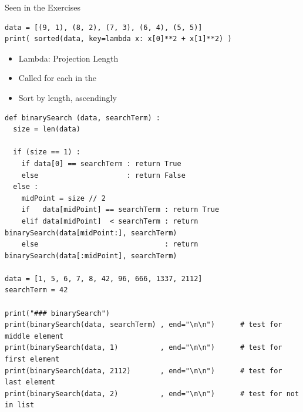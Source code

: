 \begin{frame}[fragile]{Seen in the Exercises}
%
\begin{codebox}
\begin{verbatim}
data = [(9, 1), (8, 2), (7, 3), (6, 4), (5, 5)]
print( sorted(data, key=lambda x: x[0]**2 + x[1]**2) )
\end{verbatim}
\end{codebox}
%
\begin{itemize}
\item Lambda: Projection  \thus Length
\item Called for each  in the 
\item Sort by length, ascendingly 
\end{itemize}
%
\end{frame}


\begin{frame}[fragile]
%
\begin{codebox}
\begin{verbatim}
def binarySearch (data, searchTerm) :
  size = len(data)
  
  if (size == 1) :
    if data[0] == searchTerm : return True
    else                     : return False
  else :
    midPoint = size // 2
    if   data[midPoint] == searchTerm : return True
    elif data[midPoint]  < searchTerm : return binarySearch(data[midPoint:], searchTerm)
    else                              : return binarySearch(data[:midPoint], searchTerm)

data = [1, 5, 6, 7, 8, 42, 96, 666, 1337, 2112]
searchTerm = 42

print("### binarySearch")
print(binarySearch(data, searchTerm) , end="\n\n")      # test for middle element
print(binarySearch(data, 1)          , end="\n\n")      # test for first element
print(binarySearch(data, 2112)       , end="\n\n")      # test for last element
print(binarySearch(data, 2)          , end="\n\n")      # test for not in list
\end{verbatim}
\end{codebox}
%
\end{frame}


